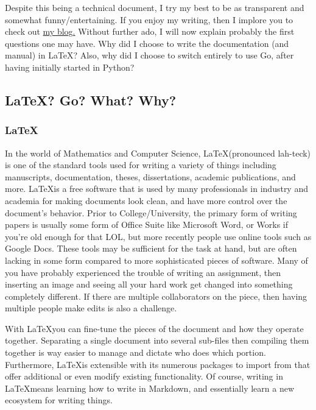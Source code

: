 \documentclass[letterpaper,12pt]{article}
\begin{document}
Despite this being a technical document, I try my best to be as
transparent and somewhat funny/entertaining. If you enjoy my writing,
then I implore you to check out
\href{https://personal-website-ezra-dvlpr.vercel.app/blog}{my blog.}
Without further ado, I will now explain probably the first questions
one may have.
Why did I choose to write the documentation (and manual) in \LaTeX?
Also, why did I choose to switch entirely to use Go, after having
initially started in Python?

\subsection{\LaTeX? Go? What? Why?}

\subsubsection{\LaTeX}

In the world of Mathematics and Computer Science, \LaTeX (pronounced
lah-teck) is one of
the standard tools used for writing a variety of things including
manuscripts, documentation, theses, dissertations, academic
publications, and more.
\LaTeX is a free software that is used by
many professionals in industry and academia for making documents look
clean, and have more control over the document's behavior.
Prior to College/University, the primary form of writing papers is
usually some form of Office Suite like Microsoft Word, or Works if
you're old enough for that LOL, but more recently people use online
tools such as Google Docs.
These tools may be sufficient for the task at hand, but are often
lacking in some form compared to more sophisticated pieces of software.
Many of you have probably experienced the trouble of writing an
assignment, then inserting an image and seeing all your hard work get
changed into something completely different.
If there are multiple collaborators on the piece, then having
multiple people make edits is also a challenge.

With \LaTeX you can fine-tune the pieces of the document and how they
operate together.
Separating a single document into several sub-files then compiling
them together is way easier to manage and dictate who does which portion.
Furthermore, \LaTeX is extensible with its numerous packages to
import from that offer additional or even modify existing functionality.
Of course, writing in \LaTeX means learning how to write in Markdown,
and essentially learn a new ecosystem for writing things.
\end{document}
